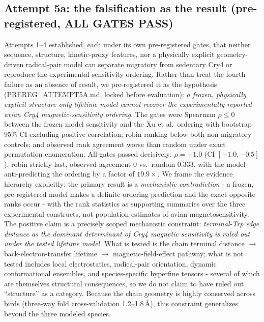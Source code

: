 \documentclass[12pt,a4paper]{article}
\begin{document}
\subsection{Attempt 5a: the falsification as the result (pre-registered, ALL GATES PASS)}
Attempts 1--4 established, each under its own pre-registered gates, that neither sequence, structure, kinetic-proxy features, nor a physically explicit geometry-driven radical-pair model can separate migratory from sedentary Cry4 or reproduce the experimental sensitivity ordering. Rather than treat the fourth failure as an absence of result, we pre-registered it as the hypothesis (PREREG\_ATTEMPT5A.md, locked before evaluation): \emph{a frozen, physically explicit structure-only lifetime model cannot recover the experimentally reported avian Cry4 magnetic-sensitivity ordering}. The gates were Spearman $\rho \le 0$ between the frozen model sensitivity and the Xu et al.\ ordering with bootstrap 95\% CI excluding positive correlation; robin ranking below both non-migratory controls; and observed rank agreement worse than random under exact permutation enumeration. All gates passed decisively: $\rho = -1.0$ (CI $[-1.0, -0.5]$), robin strictly last, observed agreement $0$ vs.\ random $0.333$, with the model anti-predicting the ordering by a factor of $19.9\times$. We frame the evidence hierarchy explicitly: the primary result is a \emph{mechanistic contradiction} - a frozen, pre-registered model makes a definite ordering prediction and the exact opposite ranks occur - with the rank statistics as supporting summaries over the three experimental constructs, not population estimates of avian magnetosensitivity. The positive claim is a precisely scoped mechanistic constraint: \emph{terminal-Trp edge distance as the dominant determinant of Cry4 magnetic sensitivity is ruled out under the tested lifetime model.} What is tested is the chain terminal distance $\to$ back-electron-transfer lifetime $\to$ magnetic-field-effect pathway; what is not tested includes local electrostatics, radical-pair orientation, dynamic conformational ensembles, and species-specific hyperfine tensors - several of which are themselves structural consequences, so we do not claim to have ruled out ``structure'' as a category. Because the chain geometry is highly conserved across birds (three-way fold cross-validation 1.2--1.8\,\AA), this constraint generalizes beyond the three modeled species.
\end{document}

